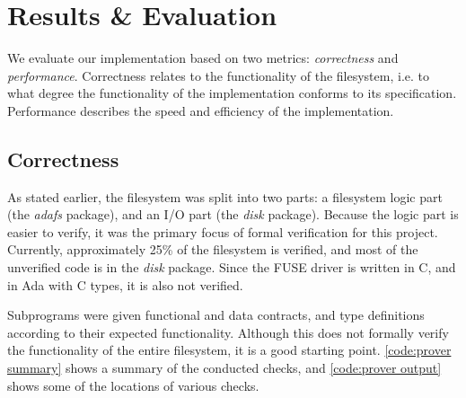 \section{Results \& Evaluation}
We evaluate our implementation based on two metrics: \textit{correctness} and \textit{performance}.
Correctness relates to the functionality of the filesystem, i.e. to what degree the functionality of the implementation conforms to its specification.
Performance describes the speed and efficiency of the implementation.

\subsection{Correctness}
As stated earlier, the filesystem was split into two parts: a filesystem logic part (the \textit{adafs} package), and an I/O part (the \textit{disk} package).
Because the logic part is easier to verify, it was the primary focus of formal verification for this project.
Currently, approximately 25\% of the filesystem is verified, and most of the unverified code is in the \textit{disk} package.
Since the FUSE driver is written in C, and in Ada with C types, it is also not verified.

Subprograms were given functional and data contracts, and type definitions according to their expected functionality.
Although this does not formally verify the functionality of the entire filesystem, it is a good starting point.
\autoref{code:prover summary} shows a summary of the conducted checks, and \autoref{code:prover output} shows some of the locations of various checks.

